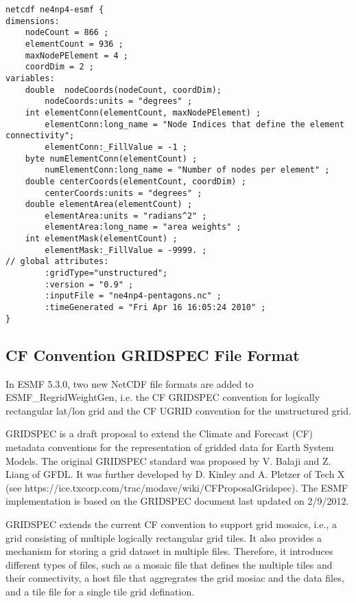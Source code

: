 \begin{verbatim}
netcdf ne4np4-esmf {
dimensions:	
	nodeCount = 866 ;
	elementCount = 936 ;
	maxNodePElement = 4 ;
	coordDim = 2 ;
variables:	
	double 	nodeCoords(nodeCount, coordDim);
		nodeCoords:units = "degrees" ;
	int elementConn(elementCount, maxNodePElement) ;
		elementConn:long_name = "Node Indices that define the element connectivity";
		elementConn:_FillValue = -1 ;	
	byte numElementConn(elementCount) ;
		numElementConn:long_name = "Number of nodes per element" ;
	double centerCoords(elementCount, coordDim) ;
		centerCoords:units = "degrees" ;
	double elementArea(elementCount) ;
		elementArea:units = "radians^2" ;
		elementArea:long_name = "area weights" ;
	int elementMask(elementCount) ;
		elementMask:_FillValue = -9999. ;
// global attributes:
		:gridType="unstructured";
		:version = "0.9" ;
		:inputFile = "ne4np4-pentagons.nc" ;
		:timeGenerated = "Fri Apr 16 16:05:24 2010" ;
}
\end{verbatim}

\subsection{CF Convention GRIDSPEC File Format}\label{sec:fileformat:gridspec}

In ESMF 5.3.0, two new NetCDF file formats are added to ESMF\_RegridWeightGen, i.e. the CF GRIDSPEC convention 
for logically rectangular lat/lon grid and the CF UGRID convention for the unstructured grid.

GRIDSPEC is a draft proposal to extend the Climate and Forecast (CF) metadata conventions for the representation of gridded data for Earth System Models.  The original GRIDSPEC standard was proposed by V. Balaji and Z. Liang of GFDL.  It was further developed by D. Kinley and A. Pletzer of Tech X (see  {https://ice.txcorp.com/trac/modave/wiki/CFProposalGridspec}).  The ESMF implementation is based on the GRIDSPEC document last updated on 2/9/2012.

GRIDSPEC extends the current CF convention to support grid  mosaics, i.e., a grid consisting of multiple logically 
rectangular grid tiles. It also provides a mechanism for storing a grid dataset in multiple files.  Therefore, 
it introduces different types of files, such as a mosaic file that defines the multiple tiles and their 
connectivity, a host file that aggregrates the grid mosiac and the data files, and a tile file for a single tile
grid defination.  

